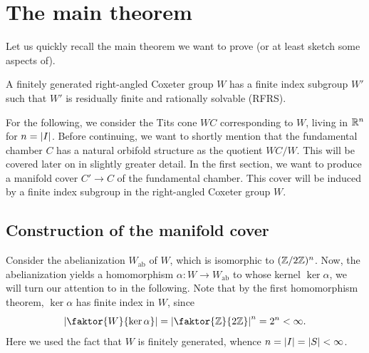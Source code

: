 \chapter{The main theorem}

Let us quickly recall the main theorem we want to prove (or at least sketch some aspects of).

\begin{theorem*}
    A finitely generated right-angled Coxeter group \(W\) has a finite index subgroup \(W'\) such that \(W'\) is residually finite and rationally solvable (RFRS).
\end{theorem*}

For the following, we consider the Tits cone \(WC\) corresponding to \(W\), living in \(\mathbb{R}^n\) for \(n = \left\vert I\right\vert\).
Before continuing, we want to shortly mention that the fundamental chamber \(C\) has a natural orbifold structure as the quotient \(WC/W\).
This will be covered later on in slightly greater detail.
In the first section, we want to produce a manifold cover \(C' \to C\) of the fundamental chamber.
This cover will be induced by a finite index subgroup in the right-angled Coxeter group \(W\).


\section{Construction of the manifold cover}

Consider the abelianization \(W_{\text{ab}}\) of \(W\), which is isomorphic to \((\mathbb{Z}/2\mathbb{Z})^{n}\).
Now, the abelianization yields a homomorphism \(\alpha : W \to W_{\text{ab}}\) to whose kernel \(\ker\alpha\), we will turn our attention to in the following.
Note that by the first homomorphism theorem, \(\ker\alpha\) has finite index in \(W\), since
\[\abs{\faktor{W}{\ker\alpha}} = \abs{\faktor{\Z}{2\Z}}^{n} = 2^{n} < \infty.\]
Here we used the fact that \(W\) is finitely generated, whence \(n = \left\vert I\right\vert = \left\vert S\right\vert < \infty\).

